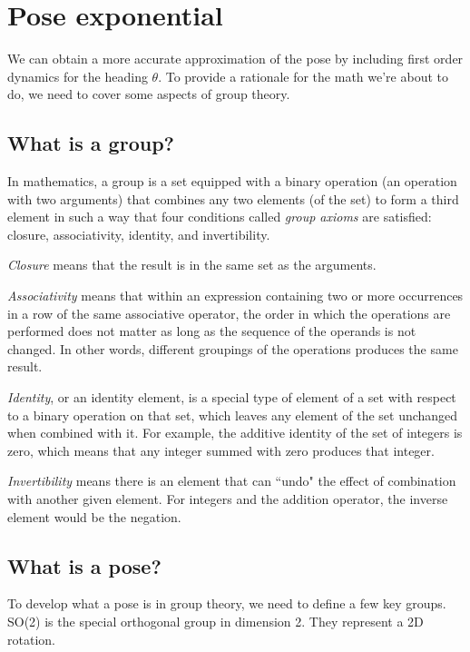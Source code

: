 \section{Pose exponential}

We can obtain a more accurate approximation of the pose by including first order
dynamics for the heading $\theta$. To provide a rationale for the math we're
about to do, we need to cover some aspects of group theory.

\subsection{What is a group?}

In mathematics, a group is a set equipped with a binary operation (an operation
with two arguments) that combines any two elements (of the set) to form a third
element in such a way that four conditions called \textit{group axioms} are
satisfied: closure, associativity, identity, and invertibility.

\textit{Closure} means that the result is in the same set as the arguments.

\textit{Associativity} means that within an expression containing two or more
occurrences in a row of the same associative operator, the order in which the
operations are performed does not matter as long as the sequence of the operands
is not changed. In other words, different groupings of the operations produces
the same result.

\textit{Identity}, or an identity element, is a special type of element of a set
with respect to a binary operation on that set, which leaves any element of the
set unchanged when combined with it. For example, the additive identity of the
set of integers is zero, which means that any integer summed with zero produces
that integer.

\textit{Invertibility} means there is an element that can ``undo" the effect of
combination with another given element. For integers and the addition operator,
the inverse element would be the negation.

\subsection{What is a pose?}

To develop what a pose is in group theory, we need to define a few key groups.
SO(2) is the special orthogonal group in dimension 2. They represent a 2D
rotation.

